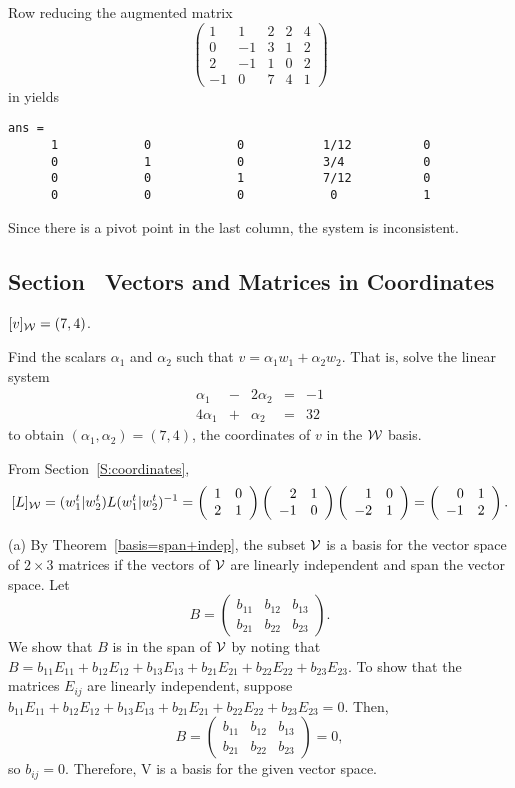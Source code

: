 \soln Row reducing the augmented matrix
\[
\left(\begin{array}{rrrr|r} 1 & 1 & 2 & 2 & 4 \\ 0 & -1 & 3 &
1 & 2 \\ 2 & -1 & 1 & 0 & 2 \\ -1 & 0 & 7 & 4 & 1 \end{array}\right)
\]
in \Matlab yields
\begin{verbatim}
ans =
      1            0            0           1/12          0      
      0            1            0           3/4           0      
      0            0            1           7/12          0      
      0            0            0            0            1      
\end{verbatim}
Since there is a pivot point in the last column, the system is
inconsistent.



\subsection*{Section~\protect{\ref{S:coordinates}} Vectors and Matrices in
Coordinates}

\ans $[v]_{\cal W} = (7,4)$.

\soln Find the scalars $\alpha_1$ and $\alpha_2$ such that $v = \alpha_1w_1
+ \alpha_2w_2$.  That is, solve the linear system
\[ \begin{array}{rrrrr}
\alpha_1 & - & 2\alpha_2 & = & -1 \\
4\alpha_1 & + & \alpha_2 & = & 32 \end{array} \]
to obtain $(\alpha_1,\alpha_2) = (7,4)$, the coordinates
of $v$ in the ${\cal W}$ basis.

From Section~\ref{S:coordinates},
\[
[L]_{\cal W} = (w_1^t|w_2^t)L(w_1^t|w_2^t)^{-1} =
\left(\begin{array}{rr} 1 & 0\\ 2 &1\end{array}\right)\left(\begin{array}{rr} 2 & 1\\ -1 &0\end{array}\right)\left(\begin{array}{rr} 1 & 0\\ -2 &1\end{array}\right) =
\left(\begin{array}{rr} 0 & 1\\ -1 &2\end{array}\right).
\]

(a) By Theorem~\ref{basis=span+indep},
the subset ${\cal V}$ is a basis for the vector space of $2 \times
3$ matrices if the vectors of ${\cal V}$ are linearly independent and
span the vector space.  Let
\[ B = \left(\begin{array}{rrr} b_{11} & b_{12} & b_{13} \\ b_{21} &
b_{22} & b_{23} \end{array}\right). \]
We show that $B$ is in the span of ${\cal V}$ by noting that
$B = b_{11}E_{11} + b_{12}E_{12} + b_{13}E_{13} + b_{21}E_{21}
+ b_{22}E_{22} + b_{23}E_{23}$.  To show that the matrices $E_{ij}$
are linearly independent, suppose $b_{11}E_{11} + b_{12}E_{12} +
b_{13}E_{13} + b_{21}E_{21} + b_{22}E_{22} + b_{23}E_{23} = 0$.  Then,
\[  B = \left(\begin{array}{rrr} b_{11} & b_{12} & b_{13} \\ b_{21} &
b_{22} & b_{23} \end{array}\right) = 0, \]
so $b_{ij} = 0$.
Therefore, {\cal V} is a basis for the given vector space.

